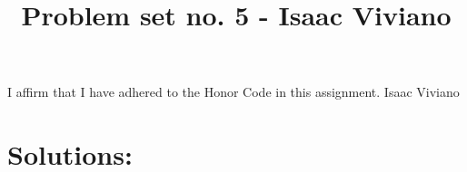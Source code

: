 \documentclass[12pt, reqno]{amsart}
\theoremstyle{definition}
\theoremstyle{remark}
\begin{document}
\title[Math 357 - Harmonic Analysis]{Problem set no. 5 - Isaac Viviano}

\begin{titlepage}
    
\maketitle

I affirm that I have adhered to the Honor Code in this assignment.
Isaac Viviano
\end{titlepage}



\section{Solutions:} 
\end{document}

